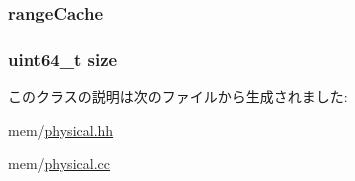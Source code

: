 \label{classPhysicalMemory_a4c874036afca619454444242943675f4}
\hypertarget{classPhysicalMemory_a356adf3dbde22587d20fa428473a00d6}{
\subsubsection[{rangeCache}]{ {\bf rangeCache}}}
\label{classPhysicalMemory_a356adf3dbde22587d20fa428473a00d6}
\hypertarget{classPhysicalMemory_af931a8871310b4dad23f0f0b0f623560}{
\subsubsection[{size}]{\setlength{\rightskip}{0pt plus 5cm}uint64\_\-t {\bf size}}}
\label{classPhysicalMemory_af931a8871310b4dad23f0f0b0f623560}


このクラスの説明は次のファイルから生成されました:\begin{DoxyCompactItemize}
\item 
mem/\hyperlink{physical_8hh}{physical.hh}\item 
mem/\hyperlink{physical_8cc}{physical.cc}\end{DoxyCompactItemize}
